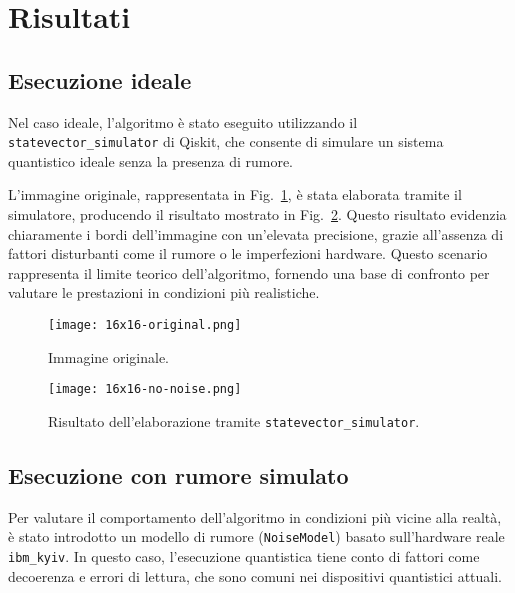 \section{Risultati}\label{sec:risultati}

\subsection{Esecuzione ideale}

Nel caso ideale, l'algoritmo è stato eseguito
utilizzando il \texttt{statevector\_simulator} di Qiskit, che consente di
simulare un sistema quantistico ideale senza la presenza di rumore.

L'immagine originale, rappresentata in Fig.~\ref{fig:16x16-original}, è stata
elaborata tramite il simulatore, producendo il risultato mostrato in
Fig.~\ref{fig:16x16-no-noise}. Questo risultato evidenzia chiaramente i bordi
dell'immagine con un'elevata precisione, grazie all'assenza di fattori
disturbanti come il rumore o le imperfezioni hardware. Questo scenario
rappresenta il limite teorico dell'algoritmo, fornendo una base di confronto per
valutare le prestazioni in condizioni più realistiche.

\begin{figure}
	\begin{center}
		\texttt{[image: 16x16-original.png]}
	\end{center}
	\caption{Immagine originale.}\label{fig:16x16-original}
\end{figure}

\begin{figure}
	\begin{center}
		\texttt{[image: 16x16-no-noise.png]}
	\end{center}
	\caption{Risultato dell'elaborazione tramite \texttt{statevector\_simulator}.}\label{fig:16x16-no-noise}
\end{figure}

\subsection{Esecuzione con rumore simulato}

Per valutare il comportamento dell'algoritmo in condizioni più vicine alla
realtà, è stato introdotto un modello di rumore (\texttt{NoiseModel}) basato
sull'hardware reale \texttt{ibm\_kyiv}. In questo caso, l'esecuzione quantistica
tiene conto di fattori come decoerenza e errori di lettura, che sono comuni nei
dispositivi quantistici attuali.

